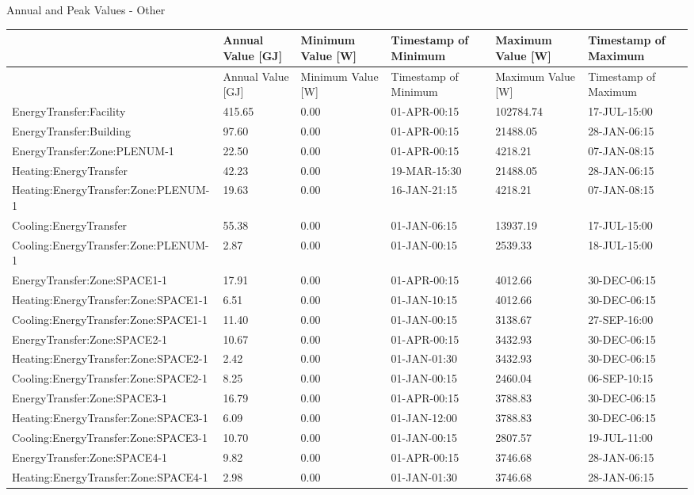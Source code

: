 Annual and Peak Values - Other

{\scriptsize
\begin{longtable}[c]{>{\raggedright}p{1.0in}>{\raggedright}p{1.0in}>{\raggedright}p{1.0in}>{\raggedright}p{1.0in}>{\raggedright}p{1.0in}>{\raggedright}p{1.0in}}
\toprule 
 & Annual Value [GJ] & Minimum Value [W] & Timestamp of Minimum & Maximum Value [W] & Timestamp of Maximum \tabularnewline
\midrule
\endfirsthead

\toprule 
 & Annual Value [GJ] & Minimum Value [W] & Timestamp of Minimum & Maximum Value [W] & Timestamp of Maximum \tabularnewline
\midrule
\endhead

EnergyTransfer\-:Facility & 415.65 & 0.00 & 01-APR-00\-:15 & 102784.74 & 17-JUL-15\-:00 \tabularnewline
EnergyTransfer\-:Building & 97.60 & 0.00 & 01-APR-00\-:15 & 21488.05 & 28-JAN-06\-:15 \tabularnewline
EnergyTransfer\-:Zone\-:PLENUM-1 & 22.50 & 0.00 & 01-APR-00\-:15 & 4218.21 & 07-JAN-08\-:15 \tabularnewline
Heating\-:EnergyTransfer & 42.23 & 0.00 & 19-MAR-15\-:30 & 21488.05 & 28-JAN-06\-:15 \tabularnewline
Heating\-:EnergyTransfer\-:Zone\-:PLENUM-1 & 19.63 & 0.00 & 16-JAN-21\-:15 & 4218.21 & 07-JAN-08\-:15 \tabularnewline
Cooling\-:EnergyTransfer & 55.38 & 0.00 & 01-JAN-06\-:15 & 13937.19 & 17-JUL-15\-:00 \tabularnewline
Cooling\-:EnergyTransfer\-:Zone\-:PLENUM-1 & 2.87 & 0.00 & 01-JAN-00\-:15 & 2539.33 & 18-JUL-15\-:00 \tabularnewline
EnergyTransfer\-:Zone\-:SPACE1-1 & 17.91 & 0.00 & 01-APR-00\-:15 & 4012.66 & 30-DEC-06\-:15 \tabularnewline
Heating\-:EnergyTransfer\-:Zone\-:SPACE1-1 & 6.51 & 0.00 & 01-JAN-10\-:15 & 4012.66 & 30-DEC-06\-:15 \tabularnewline
Cooling\-:EnergyTransfer\-:Zone\-:SPACE1-1 & 11.40 & 0.00 & 01-JAN-00\-:15 & 3138.67 & 27-SEP-16\-:00 \tabularnewline
EnergyTransfer\-:Zone\-:SPACE2-1 & 10.67 & 0.00 & 01-APR-00\-:15 & 3432.93 & 30-DEC-06\-:15 \tabularnewline
Heating\-:EnergyTransfer\-:Zone\-:SPACE2-1 & 2.42 & 0.00 & 01-JAN-01\-:30 & 3432.93 & 30-DEC-06\-:15 \tabularnewline
Cooling\-:EnergyTransfer\-:Zone\-:SPACE2-1 & 8.25 & 0.00 & 01-JAN-00\-:15 & 2460.04 & 06-SEP-10\-:15 \tabularnewline
EnergyTransfer\-:Zone\-:SPACE3-1 & 16.79 & 0.00 & 01-APR-00\-:15 & 3788.83 & 30-DEC-06\-:15 \tabularnewline
Heating\-:EnergyTransfer\-:Zone\-:SPACE3-1 & 6.09 & 0.00 & 01-JAN-12\-:00 & 3788.83 & 30-DEC-06\-:15 \tabularnewline
Cooling\-:EnergyTransfer\-:Zone\-:SPACE3-1 & 10.70 & 0.00 & 01-JAN-00\-:15 & 2807.57 & 19-JUL-11\-:00 \tabularnewline
EnergyTransfer\-:Zone\-:SPACE4-1 & 9.82 & 0.00 & 01-APR-00\-:15 & 3746.68 & 28-JAN-06\-:15 \tabularnewline
Heating\-:EnergyTransfer\-:Zone\-:SPACE4-1 & 2.98 & 0.00 & 01-JAN-01\-:30 & 3746.68 & 28-JAN-06\-:15 \tabularnewline

\end{longtable}}
